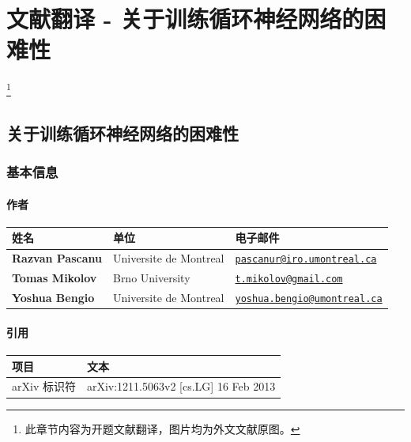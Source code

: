 \chapter{文献翻译 - 关于训练循环神经网络的困难性}\footnote{此章节内容为开题文献翻译，图片均为外文文献原图。}

\section{关于训练循环神经网络的困难性}\label{ux5173ux4e8eux8badux7ec3ux5faaux73afux795eux7ecfux7f51ux7edcux7684ux56f0ux96beux6027}

\subsection{基本信息}\label{ux57faux672cux4fe1ux606f}

\subsubsection{作者}\label{ux4f5cux8005}

\begin{longtable}[]{@{}lll@{}}
  \toprule\noalign{}
  姓名                    & 单位                   & 电子邮件 \\
  \midrule\noalign{}
  \endhead
  \bottomrule\noalign{}
  \endlastfoot
  \textbf{Razvan Pascanu} & Universite de Montreal &
  \href{mailto:pascanur@iro.umontreal.ca}{\nolinkurl{pascanur@iro.umontreal.ca}} \\
  \textbf{Tomas Mikolov}  & Brno University        &
  \href{mailto:t.mikolov@gmail.com}{\nolinkurl{t.mikolov@gmail.com}} \\
  \textbf{Yoshua Bengio}  & Universite de Montreal &
  \href{mailto:yoshua.bengio@umontreal.ca}{\nolinkurl{yoshua.bengio@umontreal.ca}} \\
\end{longtable}

\subsubsection{引用}\label{ux5f15ux7528}

\begin{longtable}[]{@{}ll@{}}
  \toprule\noalign{}
  项目         & 文本                                      \\
  \midrule\noalign{}
  \endhead
  \bottomrule\noalign{}
  \endlastfoot
  arXiv 标识符 & arXiv:1211.5063v2 {[}cs.LG{]} 16 Feb 2013 \\
\end{longtable}


